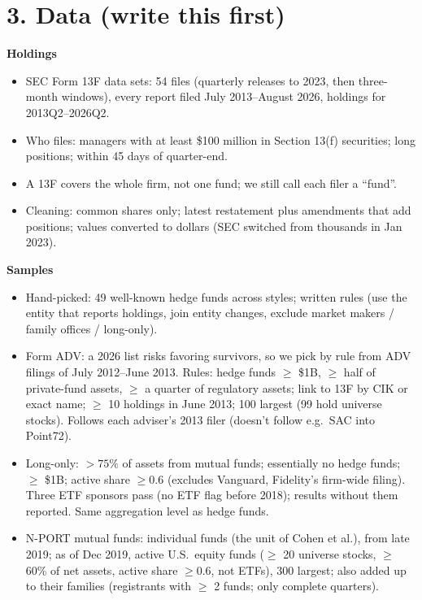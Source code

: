 \documentclass[11pt]{article}
\begin{document}
\section*{3. Data (write this first)}
\textbf{Holdings}
\begin{itemize}
  \item SEC Form 13F data sets: 54 files (quarterly releases to 2023, then
  three-month windows), every report filed July 2013--August 2026, holdings for
  2013Q2--2026Q2.
  \item Who files: managers with at least \$100 million in Section 13(f)
  securities; long positions; within 45 days of quarter-end.
  \item A 13F covers the whole firm, not one fund; we still call each filer a
  ``fund''.
  \item Cleaning: common shares only; latest restatement plus amendments that add
  positions; values converted to dollars (SEC switched from thousands in Jan 2023).
\end{itemize}
\textbf{Samples}
\begin{itemize}
  \item Hand-picked: 49 well-known hedge funds across styles; written rules
  (use the entity that reports holdings, join entity changes, exclude market
  makers / family offices / long-only).
  \item Form ADV: a 2026 list risks favoring survivors, so we pick by rule from
  ADV filings of July 2012--June 2013. Rules: hedge funds $\ge$ \$1B, $\ge$ half
  of private-fund assets, $\ge$ a quarter of regulatory assets; link to 13F by CIK
  or exact name; $\ge$ 10 holdings in June 2013; 100 largest (99 hold universe
  stocks). Follows each adviser's 2013 filer (doesn't follow e.g.\ SAC into Point72).
  \item Long-only: $>75\%$ of assets from mutual funds; essentially no hedge funds;
  $\ge$ \$1B; active share $\ge 0.6$ (excludes Vanguard, Fidelity's firm-wide
  filing). Three ETF sponsors pass (no ETF flag before 2018); results without them
  reported. Same aggregation level as hedge funds.
  \item N-PORT mutual funds: individual funds (the unit of Cohen et al.), from late
  2019; as of Dec 2019, active U.S.\ equity funds ($\ge$ 20 universe stocks, $\ge$
  60\% of net assets, active share $\ge 0.6$, not ETFs), 300 largest; also added up
  to their families (registrants with $\ge$ 2 funds; only complete quarters).
\end{itemize}
\end{document}
